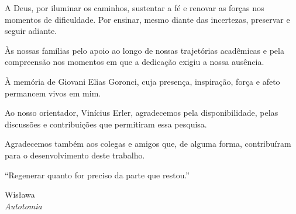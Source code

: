 \documentclass[arial,centeredequations,english,brazilian,oneside,section=TITLE]{ifes8}
\begin{document}
\begin{agradecimentos}
A Deus, por iluminar os caminhos, sustentar a fé e renovar as forças nos momentos de dificuldade. Por ensinar,
mesmo diante das incertezas, preservar e seguir adiante.

Às nossas famílias pelo apoio ao longo de nossas trajetórias acadêmicas e pela compreensão
nos momentos em que a dedicação exigiu a nossa ausência. 

À memória de Giovani Elias Goronci, cuja presença, inspiração, força e afeto permancem vivos em mim.

Ao nosso orientador, Vinícius Erler, agradecemos pela disponibilidade, pelas discussões e contribuições que
permitiram essa pesquisa.

Agradecemos também aos colegas e amigos que, de alguma forma, contribuíram para o desenvolvimento deste trabalho.

\end{agradecimentos}


\begin{epigrafe}
  \vspace*{\fill}
  \begin{flushright}
    \begin{minipage}{0.60\textwidth}
      \raggedleft
      \begin{SingleSpace}
        ``Regenerar quanto for preciso da parte que restou.''

        \medskip
        Wisława \\
        \textit{Autotomia}
      \end{SingleSpace}
    \end{minipage}
  \end{flushright}
\end{epigrafe}
\end{document}
